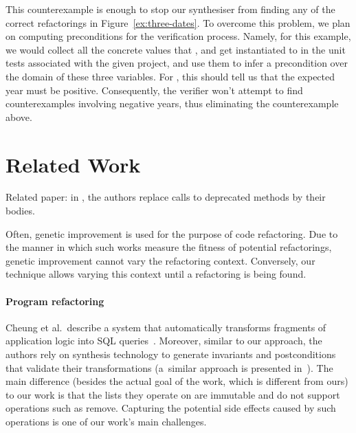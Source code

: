 \documentclass[runningheads,a4paper]{llncs}
\begin{document}
  This counterexample is enough to stop our synthesiser from finding any of the correct refactorings in Figure~\ref{ex:three-dates}.
  To overcome this problem, we plan on computing preconditions for the verification process. Namely, for this example, we would collect all the concrete values that
  ,  and  get instantiated to in the unit tests associated with the given project, and use them to
  infer a precondition over the domain of these three variables. For , this should tell us that the expected year must be positive.
  Consequently, the verifier won't attempt to find counterexamples involving negative years, thus eliminating the counterexample above.


  
\section{Related Work}

Related paper: in \cite{DBLP:conf/paste/Perkins05}, the authors
replace calls to deprecated methods by their bodies.

Often, genetic improvement
\cite{DBLP:journals/dagstuhl-reports/PetkeGFL18} is used for the
purpose of code refactoring. Due to the manner in which such works measure
the fitness of potential refactorings, genetic improvement cannot vary
the refactoring context.  Conversely, our technique allows varying this
context until a refactoring is being found.

\paragraph{Program refactoring}

Cheung et al.~describe a system that automatically transforms fragments of
application logic into SQL queries~\cite{DBLP:conf/pldi/CheungSM13}. 
Moreover, similar to our approach, the authors rely on synthesis technology
to generate invariants and postconditions that validate their
transformations (a~similar approach is presented
in~\cite{DBLP:conf/cc/IuCZ10}).  The main difference (besides the actual
goal of the work, which is different from ours) to our work is that the
lists they operate on are immutable and do not support operations such as
remove.  Capturing the potential side effects caused by such operations is
one of our work's main challenges.
\end{document}
